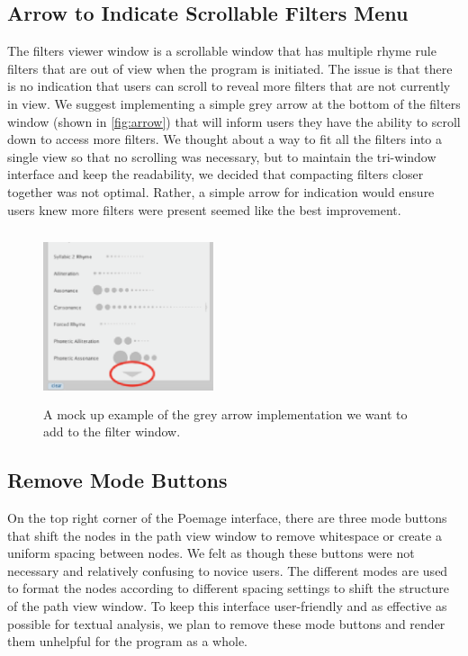 \documentclass[journal]{vgtc}                %
\begin{document}
\subsection{Arrow to Indicate Scrollable Filters Menu}
The filters viewer window is a scrollable window that has multiple rhyme rule filters that are out of view when the program is initiated. The issue is that there is no indication that users can scroll to reveal more filters that are not currently in view. We suggest implementing a simple grey arrow at the bottom of the filters window (shown in \autoref{fig:arrow}) that will inform users they have the ability to scroll down to access more filters. We thought about a way to fit all the filters into a single view so that no scrolling was necessary, but to maintain the tri-window interface and keep the readability, we decided that compacting filters closer together was not optimal. Rather, a simple arrow for indication would ensure users knew more filters were present seemed like the best improvement. 
\begin{figure}[H]
\centering
\includegraphics[width=5cm,height=5cm]{s.eps}
\caption{A mock up example of the grey arrow implementation we want to add to the filter window. \label{overflow}}
\label{fig:arrow}
\end{figure}
\subsection{Remove Mode Buttons}
On the top right corner of the Poemage interface, there are three mode buttons that shift the nodes in the path view window to remove whitespace or create a uniform spacing between nodes. We felt as though these buttons were not necessary and relatively confusing to novice users. The different modes are used to format the nodes according to different spacing settings to shift the structure of the path view window. To keep this interface user-friendly and as effective as possible for textual analysis, we plan to remove these mode buttons and render them unhelpful for the program as a whole. 
\end{document}
